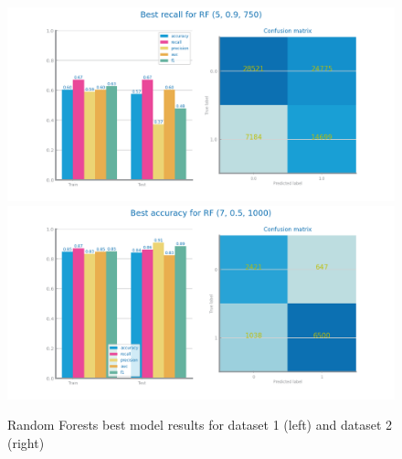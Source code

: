 \documentclass[10pt]{extarticle}
\begin{document}
\begin{figure}[H]
\centering\includegraphics[scale=0.4]{images/dataset1/models_evaluation/CovidPos_rf_RF_best_recall_eval.png}
\includegraphics[scale=0.4]{images/dataset2/models_evaluation/Credit_Score_rf_RF_best_accuracy_eval.png}
\caption{Random Forests best model results for dataset 1 (left) and dataset 2 (right)}
\end{figure}
\end{document}
